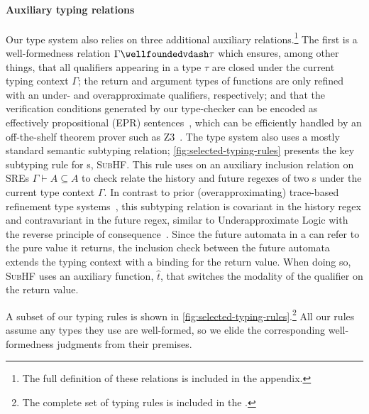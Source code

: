 \paragraph{Auxiliary typing relations}
Our type system also relies on three additional auxiliary
relations.\footnote{The full definition of these relations is included
  in the appendix.} The first is a well-formedness relation
$\Gamma \wellfoundedvdash \tau$ which ensures, among other things,
that all qualifiers appearing in a type $\tau$ are closed under the
current typing context $\Gamma$; the return and argument types of
functions are only refined with an under- and overapproximate
qualifiers, respectively; and that the verification conditions
generated by our type-checker  can be encoded as effectively propositional (EPR)
sentences~\cite{Ramsey1987}, which can be efficiently handled by an
off-the-shelf theorem prover such as Z3~\cite{de2008z3}.  The type
system also uses a mostly standard semantic subtyping relation;
\autoref{fig:selected-typing-rules} presents the key subtyping rule
for \tyName{}s, \textsc{SubHF}.  This rule uses on an auxiliary
inclusion relation on SREs $\Gamma \vdash A \subseteq A$ to check
relate the history and future regexes of two \tyName{}s under the
current type context $\Gamma$. In contrast to prior
(overapproximating) trace-based refinement type systems~\cite{ZYDJ24},
this subtyping relation is covariant in the history regex and
contravariant in the future regex, similar to Underapproximate Logic
with the reverse principle of consequence~. Since the future
automata in a \tyName{} can refer to the pure value it returns, the
inclusion check between the future automata extends the typing context
with a binding for the return value. When doing so, \textsc{SubHF}
uses an auxiliary function, $\widehat{t}$, that switches the modality
of the qualifier on the return value. 

A subset of our typing rules is shown in
\autoref{fig:selected-typing-rules}.\footnote{The complete set of
  typing rules is included in the \techreport{}.}  All our rules
assume any types they use are well-formed, so we elide the
corresponding well-formedness judgments from their premises.

